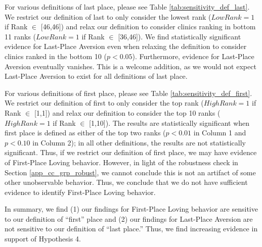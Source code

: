 For various definitions of last place, please see Table \ref{tab:sensitivity_def_last}. We restrict our definition of last to only consider the lowest rank ($LowRank = 1$ if Rank $\in$ [46,46]) and relax our definition to consider clinics ranking in bottom 11 ranks ($LowRank = 1$ if Rank $\in$ [36,46]). We find statistically significant evidence for Last-Place Aversion even when relaxing the definition to consider clinics ranked in the bottom 10 ($p < 0.05$). Furthermore, evidence for Last-Place Aversion eventually vanishes. This is a welcome addition, as we would not expect Last-Place Aversion to exist for all definitions of last place. 

For various definitions of first place, please see Table \ref{tab:sensitivity_def_first}. We restrict our definition of first to only consider the top rank ($HighRank = 1$ if Rank $\in$ [1,1]) and relax our definition to consider the top 10 ranks ($HighRank = 1$ if Rank $\in$ [1,10]). The results are statistically significant when first place is defined as either of the top two ranks ($p < 0.01$ in Column 1 and $p < 0.10$ in Column 2); in all other definitions, the results are not statistically significant. Thus, if we restrict our definition of first place, we may have evidence of First-Place Loving behavior. However, in light of the robustness check in Section \ref{app_cc_grp_robust}, we cannot conclude this is not an artifact of some other unobservable behavior. Thus, we conclude that we do not have sufficient evidence to identify First-Place Loving behavior.

In summary, we find (1) our findings for First-Place Loving behavior are sensitive to our definition of “first” place and (2) our findings for Last-Place Aversion are not sensitive to our definition of “last place.” Thus, we find increasing evidence in support of Hypothesis 4. 


